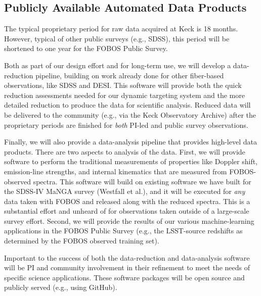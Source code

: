 \documentclass[oneside,11pt]{amsart}
\newcommand{\comment}[2][todo]{{\color{#1}[[{\bf #2}]]}}
\begin{document}
\subsection{Publicly Available Automated Data Products}
\label{sec:DAP}
\noindent \comment{1/2 page}

The typical proprietary period for raw data acquired at Keck is 18
months.  However, typical of other public surveys (e.g., SDSS), this
period will be shortened to one year for the FOBOS Public Survey.

Both as part of our design effort and for long-term use, we will develop
a data-reduction pipeline, building on work already done for other
fiber-based observations, like SDSS and DESI.  This software will
provide both the quick reduction assessments needed for our dynamic
targeting system and the more detailed reduction to produce the data for
scientific analysis.  Reduced data will be delivered to the community
(e.g., via the Keck Observatory Archive) after the proprietary periods
are finished for {\it both} PI-led and public survey observations.

Finally, we will also provide a data-analysis pipeline that provides
high-level data products.  There are two aspects to analysis of the
data.  First, we will provide software to perform the traditional
measurements of properties like Doppler shift, emission-line strengths,
and internal kinematics that are measured from FOBOS-observed spectra.
This software will build on existing software we have built for the
SDSS-IV MaNGA survey (Westfall et al.), and it will be executed for {\it
any} data taken with FOBOS and released along with the reduced spectra.
This is a substantial effort and unheard of for observations taken
outside of a large-scale survey effort.  Second, we will provide the
results of our various machine-learning applications in the FOBOS Public
Survey (e.g., the LSST-source redshifts as determined by the FOBOS
observed training set).

Important to the success of both the data-reduction and data-analysis
software will be PI and community involvement in their refinement to
meet the needs of specific science applications.  These software
packages will be open source and publicly served (e.g., using GitHub).

\end{document}
